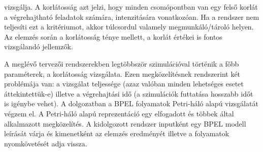 vizsgálja. A korlátosság azt jelzi, hogy minden csomópontban van egy felső korlát a végrehajtható feladatok számára, intenzitására vonatkozóan. Ha a rendszer nem teljesíti ezt a kritériumot, akkor túlcsordul valamely megmunkáló/tároló helyen. Az elemzés során a korlátosság ténye mellett, a korlát értékei is fontos vizsgálandó jellemzők. 

A meglévő tervezői rendszerekben legtöbbször szimulációval történik a főbb paraméterek, a korlátosság vizsgálata. Ezen megközelítésnek rendszerint két problémája van: a vizsgálat teljessége (azaz valóban minden lehetséges esetet áttekintettük-e) illetve a végrehajtási idő (a szimulációk futtatása hosszabb időt is igénybe vehet).
\newpage
A dolgozatban a BPEL folyamatok Petri-háló alapú vizsgálatát végzem el. A Petri-háló alapú reprezentáció egy elfogadott és többek által alkalmazott megközelítés. A kidolgozott rendszer inputként egy  BPEL modell leírását várja és kimenetként az elemzés eredményét illetve a folyamatok nyomkövetését adja vissza.